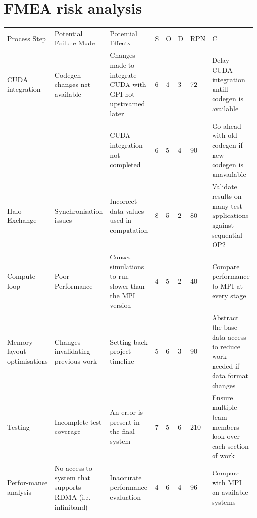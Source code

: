 \onecolumn

\appendix
\appendixpage
\addappheadtotoc
\setlength{\voffset}{-0.75in}
\addtolength{\textheight}{0.75in}




\renewcommand{\thesection}{\Alph{section}}

\section{FMEA risk analysis}\label{appendix:fmea}
\begin{table}[h!]
\begin{tabularx}{\textwidth}{|p{3.5em}|X|X|p{1em}|p{1em}|p{1em}|p{1.5em}|X|} \hline
    \rowcolor{tablegrey}
    Process Step & Potential Failure Mode & Potential \mbox{Effects} & S & O & D & RPN & C \\\hhline{========}
    CUDA integration & Codegen changes not available & Changes made to integrate CUDA with GPI not upstreamed later & 6 & 4 & 3 & 72 & Delay CUDA integration untill codegen is available\\\cline{3-8}
    && CUDA integration not completed & 6 & 5 & 4 & 90 & Go ahead with old codegen if new codegen is unavailable\\\hline
    Halo Exchange & Synchronisation issues & Incorrect data values used in computation & 8 & 5 & 2 & 80 & Validate results on many test applications against sequential OP2\\\hline
    Compute loop & Poor Performance & Causes simulations to run slower than the MPI version & 4 & 5 & 2 & 40 & Compare performance to MPI at every stage\\\hline
    Memory layout optimisations & Changes invalidating previous work & Setting back project timeline & 5 & 6 & 3 & 90 & Abstract the base data access to reduce work needed if data format changes\\\hline
    Testing & Incomplete test coverage & An error is present in the final system & 7 & 5 & 6 & 210 & Ensure multiple team members look over each section of work\\\hline
    Perfor-mance analysis & No access to system that supports RDMA (i.e. infiniband)& Inaccurate performance evaluation & 4 & 6 & 4 & 96 & Compare with MPI on available systems\\\hline
\end{tabularx}
\end{table}

